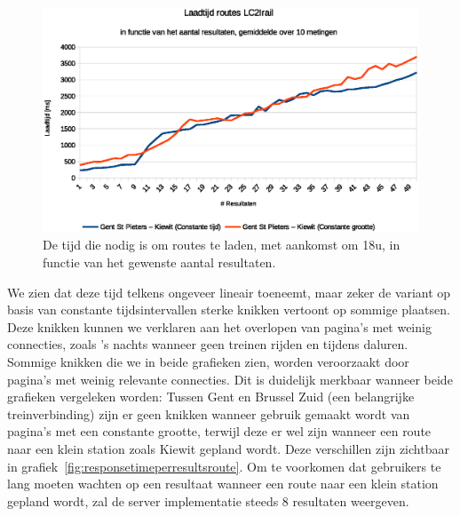 \begin{figure}[h]
	\centering
	\includegraphics[width=1.00\textwidth]{images/Laadtijd_routes_Gent-St-Pieters_Kiewit.eps}	\caption[Laadtijd van routes tussen Gent en Kiewit in functie van aantal resultaten]{De tijd die nodig is om routes te laden, met aankomst om 18u, in functie van het gewenste aantal resultaten.}
	\label{fig:responsetimeperresultsrouteKiewit}
\end{figure}

We zien dat deze tijd telkens ongeveer lineair toeneemt, maar zeker de variant op basis van constante tijdsintervallen sterke knikken vertoont op sommige plaatsen. Deze knikken kunnen we verklaren aan het overlopen van pagina's met weinig connecties, zoals 's nachts wanneer geen treinen rijden en tijdens daluren. Sommige knikken die we in beide grafieken zien, worden veroorzaakt door pagina's met weinig relevante connecties. Dit is duidelijk merkbaar wanneer beide grafieken vergeleken worden: Tussen Gent en Brussel Zuid (een belangrijke treinverbinding) zijn er geen knikken wanneer gebruik gemaakt wordt van pagina's met een constante grootte, terwijl deze er wel zijn wanneer een route naar een klein station zoals Kiewit gepland wordt. Deze verschillen zijn zichtbaar in grafiek~\ref{fig:responsetimeperresultsroute}. Om te voorkomen dat gebruikers te lang moeten wachten op een resultaat wanneer een route naar een klein station gepland wordt, zal de server implementatie steeds 8 resultaten weergeven.

